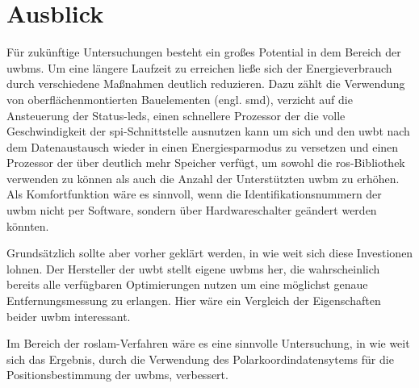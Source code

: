 %
%
\section{Ausblick}

Für zukünftige Untersuchungen besteht ein großes Potential in dem Bereich der \glspl{uwbm}. Um eine längere Laufzeit zu erreichen ließe sich der Energieverbrauch durch verschiedene Maßnahmen deutlich reduzieren. Dazu zählt die Verwendung von oberflächenmontierten Bauelementen (engl. \gls{smd}), verzicht auf die Ansteuerung der Status-\gls{led}s, einen schnellere Prozessor der die volle Geschwindigkeit der \gls{spi}-Schnittstelle ausnutzen kann um sich und den \gls{uwbt} nach dem Datenaustausch wieder in einen Energiesparmodus zu versetzen und einen Prozessor der über deutlich mehr Speicher verfügt, um sowohl die \gls{ros}-Bibliothek verwenden zu können als auch die Anzahl der Unterstützten \gls{uwbm} zu erhöhen. Als Komfortfunktion wäre es sinnvoll, wenn die Identifikationsnummern der \gls{uwbm} nicht per Software, sondern über Hardwareschalter geändert werden könnten.

Grundsätzlich sollte aber vorher geklärt werden, in wie weit sich diese Investionen lohnen. Der Hersteller der \gls{uwbt} stellt eigene \glspl{uwbm} her, die wahrscheinlich bereits alle verfügbaren Optimierungen nutzen um eine möglichst genaue Entfernungsmessung zu erlangen. Hier wäre ein Vergleich der Eigenschaften beider \gls{uwbm} interessant.

Im Bereich der \gls{roslam}-Verfahren wäre es eine sinnvolle Untersuchung, in wie weit sich das Ergebnis, durch die Verwendung des Polarkoordindatensytems für die Positionsbestimmung der \glspl{uwbm}, verbessert.



